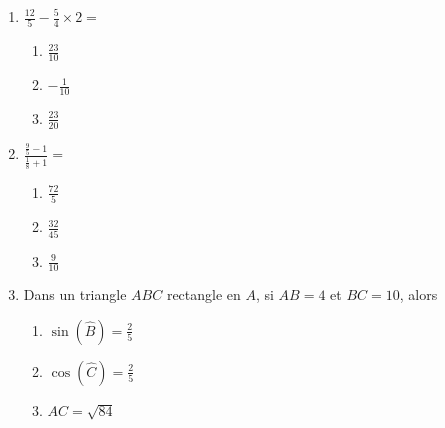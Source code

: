 \documentclass[oneside,twoside]{book}
\begin{document}
\begin{enumerate}
\begin{enumerate}

\item\BonneReponse $\{4 ;-6\}$
\item\MauvaiseReponse $\emptyset$


\item\MauvaiseReponse $\{4 ; 6\}$

\end{enumerate}



\item $\frac{12}{5} - \frac{5}{4} \times2=$

\begin{enumerate}

\item\MauvaiseReponse $\frac{23}{10}$
\item\BonneReponse $-\frac{1}{10}$

\item\MauvaiseReponse $\frac{23}{20}$


\end{enumerate}



\item $\displaystyle\frac{\frac{9}{5}-1}{\frac{1}{8}+1}=$

\begin{enumerate}


\item\MauvaiseReponse $\frac{72}{5}$
\item\BonneReponse $\frac{32}{45}$

\item\MauvaiseReponse $\frac{9}{10}$

\end{enumerate}



\item Dans un triangle $ABC$ rectangle en $A$, si $AB=4$ et $BC=10$, alors

\begin{enumerate}

\item\MauvaiseReponse $\sin (\hat{B})=\frac{2}{5}$


\item\MauvaiseReponse $\cos (\hat{C})=\frac{2}{5}$
\item\BonneReponse $AC=\sqrt{84}$

\end{enumerate}




\end{enumerate}
\end{document}
